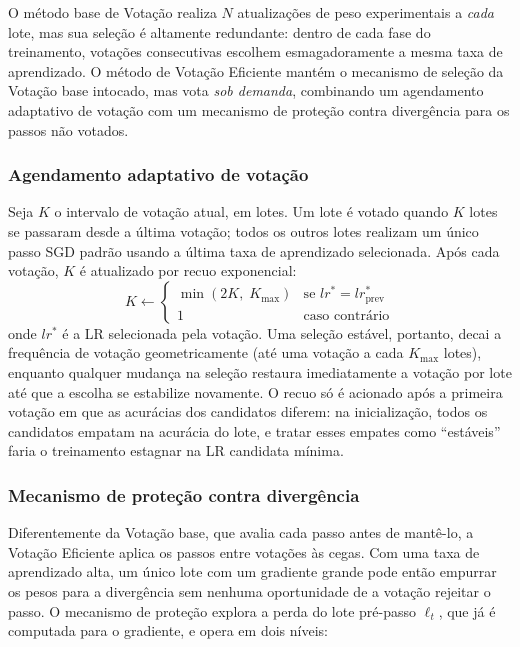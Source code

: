 \documentclass[conference]{IEEEtran}
\begin{document}
O método base de Votação realiza $N$ atualizações de peso experimentais a \emph{cada} lote, mas sua seleção é altamente redundante: dentro de cada fase do treinamento, votações consecutivas escolhem esmagadoramente a mesma taxa de aprendizado. O método de Votação Eficiente mantém o mecanismo de seleção da Votação base intocado, mas vota \emph{sob demanda}, combinando um agendamento adaptativo de votação com um mecanismo de proteção contra divergência para os passos não votados.

\subsubsection{Agendamento adaptativo de votação}
Seja $K$ o intervalo de votação atual, em lotes. Um lote é votado quando $K$ lotes se passaram desde a última votação; todos os outros lotes realizam um único passo SGD padrão usando a última taxa de aprendizado selecionada. Após cada votação, $K$ é atualizado por recuo exponencial:
\begin{equation}
K \leftarrow
\begin{cases}
\min(2K,\; K_{\max}) & \text{se } lr^{*} = lr^{*}_{\mathrm{prev}} \\
1 & \text{caso contrário}
\end{cases}
\label{eq:backoff}
\end{equation}
onde $lr^{*}$ é a LR selecionada pela votação. Uma seleção estável, portanto, decai a frequência de votação geometricamente (até uma votação a cada $K_{\max}$ lotes), enquanto qualquer mudança na seleção restaura imediatamente a votação por lote até que a escolha se estabilize novamente. O recuo só é acionado após a primeira votação em que as acurácias dos candidatos diferem: na inicialização, todos os candidatos empatam na acurácia do lote, e tratar esses empates como ``estáveis'' faria o treinamento estagnar na LR candidata mínima.

\subsubsection{Mecanismo de proteção contra divergência}
Diferentemente da Votação base, que avalia cada passo antes de mantê-lo, a Votação Eficiente aplica os passos entre votações às cegas. Com uma taxa de aprendizado alta, um único lote com um gradiente grande pode então empurrar os pesos para a divergência sem nenhuma oportunidade de a votação rejeitar o passo. O mecanismo de proteção explora a perda do lote pré-passo $\ell_t$, que já é computada para o gradiente, e opera em dois níveis:
\end{document}

